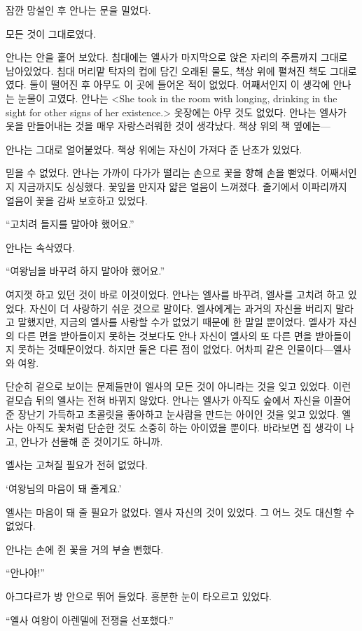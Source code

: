 잠깐 망설인 후 안나는 문을 밀었다.


모든 것이 그대로였다.

안나는 안을 훝어 보았다. 침대에는 엘사가 마지막으로 앉은 자리의 주름까지 그대로 남아있었다. 침대 머리맡 탁자의 컵에 담긴 오래된 물도, 책상 위에 펼쳐진 책도 그대로였다. 둘이 떨어진 후 아무도 이 곳에 들어온 적이 없었다. 어째서인지 이 생각에 안나는 눈물이 고였다. 안나는 <She took in the room with longing, drinking in the sight for other signs of her existence.> 옷장에는 아무 것도 없었다. 안나는 엘사가 옷을 만들어내는 것을 매우 자랑스러워한 것이 생각났다. 책상 위의 책 옆에는—

안나는 그대로 얼어붙었다. 책상 위에는 자신이 가져다 준 난초가 있었다.

믿을 수 없었다. 안나는 가까이 다가가 떨리는 손으로 꽃을 향해 손을 뻗었다. 어째서인지 지금까지도 싱싱했다. 꽃잎을 만지자 얇은 얼음이 느껴졌다. 줄기에서 이파리까지 얼음이 꽃을 감싸 보호하고 있었다.

``고치려 들지를 말아야 했어요.''

안나는 속삭였다.

``여왕님을 바꾸려 하지 말아야 했어요.''

여지껏 하고 있던 것이 바로 이것이었다. 안나는 엘사를 바꾸려, 엘사를 고치려 하고 있었다. 자신이 더 사랑하기 쉬운 것으로 말이다. 엘사에게는 과거의 자신을 버리지 말라고 말했지만, 지금의 엘사를 사랑할 수가 없었기 때문에 한 말일 뿐이었다. 엘사가 자신의 다른 면을 받아들이지 못하는 것보다도 안나 자신이 엘사의 또 다른 면을 받아들이지 못하는 것때문이었다. 하지만 둘은 다른 점이 없었다. 어차피 같은 인물이다—엘사와 여왕.

단순히 겉으로 보이는 문제들만이 엘사의 모든 것이 아니라는 것을 잊고 있었다. 이런 겉모습 뒤의 엘사는 전혀 바뀌지 않았다. 안나는 엘사가 아직도 숲에서 자신을 이끌어 준 장난기 가득하고 초콜릿을 좋아하고 눈사람을 만드는 아이인 것을 잊고 있었다. 엘사는 아직도 꽃처럼 단순한 것도 소중히 하는 아이였을 뿐이다. 바라보면 집 생각이 나고, 안나가 선물해 준 것이기도 하니까.

엘사는 고쳐질 필요가 전혀 없었다.

`여왕님의 마음이 돼 줄게요.'

엘사는 마음이 돼 줄 필요가 없었다. 엘사 자신의 것이 있었다. 그 어느 것도 대신할 수 없었다.

안나는 손에 쥔 꽃을 거의 부술 뻔했다.

``안나야!''

아그다르가 방 안으로 뛰어 들었다. 흥분한 눈이 타오르고 있었다.

``엘사 여왕이 아렌델에 전쟁을 선포했다.''

